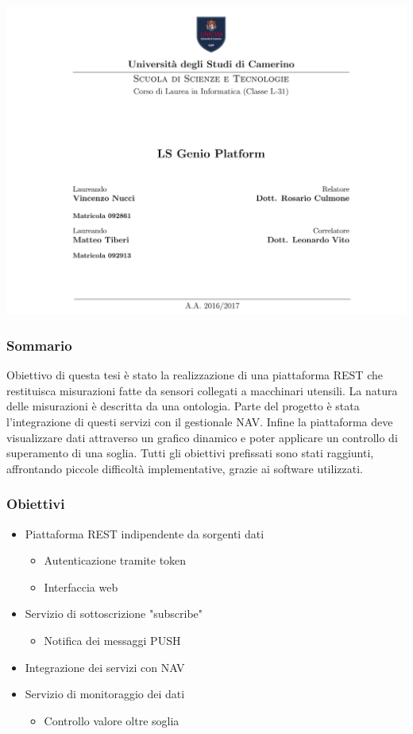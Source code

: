 \documentclass{beamer}
\date{}
\begin{document}
	
	\begin{frame}
	\centering
	\includegraphics[scale=0.25]{images/frontespizio-beamer.png}\par
\end{frame}

\begin{frame}
	\frametitle{Sommario}
	Obiettivo di questa tesi è stato la realizzazione di una piattaforma REST che restituisca misurazioni fatte da sensori collegati a macchinari utensili. La natura delle misurazioni è descritta da una ontologia. Parte del progetto è stata l'integrazione di questi servizi con il gestionale NAV. Infine la piattaforma deve visualizzare dati attraverso un grafico dinamico e poter applicare un controllo di superamento di una soglia. Tutti gli obiettivi prefissati sono stati raggiunti, affrontando piccole difficoltà implementative, grazie ai software utilizzati.
\end{frame}

\begin{frame}
\frametitle{Obiettivi}
\begin{itemize}
	\item Piattaforma REST indipendente da sorgenti dati
	\begin{itemize}
		\item Autenticazione tramite token
		\item Interfaccia web
	\end{itemize}
	\item Servizio di sottoscrizione "subscribe"
	\begin{itemize}
		\item Notifica dei messaggi PUSH
	\end{itemize}
	\item Integrazione dei servizi con NAV
	\item Servizio di monitoraggio dei dati
	\begin{itemize}
		\item Controllo valore oltre soglia
	\end{itemize}
\end{itemize}
\end{frame}
\end{document}
